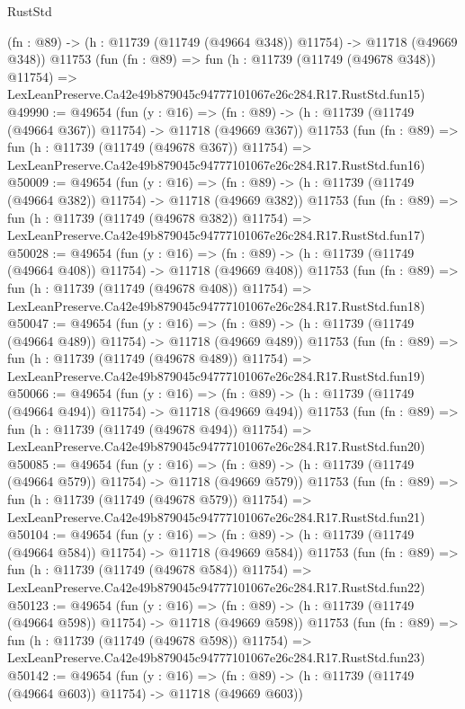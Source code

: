 \begin{lexlean}{RustStd}
\begin{coremodule}
    (fn : @89) -> (h : @11739 (@11749 (@49664 @348)) @11754) -> @11718 (@49669 @348))
    @11753
    (fun (fn : @89) =>
    fun (h : @11739 (@11749 (@49678 @348)) @11754) =>
    LexLeanPreserve.Ca42e49b879045c94777101067e26c284.R17.RustStd.fun15)
@49990 := @49654
    (fun (y : @16) =>
    (fn : @89) -> (h : @11739 (@11749 (@49664 @367)) @11754) -> @11718 (@49669 @367))
    @11753
    (fun (fn : @89) =>
    fun (h : @11739 (@11749 (@49678 @367)) @11754) =>
    LexLeanPreserve.Ca42e49b879045c94777101067e26c284.R17.RustStd.fun16)
@50009 := @49654
    (fun (y : @16) =>
    (fn : @89) -> (h : @11739 (@11749 (@49664 @382)) @11754) -> @11718 (@49669 @382))
    @11753
    (fun (fn : @89) =>
    fun (h : @11739 (@11749 (@49678 @382)) @11754) =>
    LexLeanPreserve.Ca42e49b879045c94777101067e26c284.R17.RustStd.fun17)
@50028 := @49654
    (fun (y : @16) =>
    (fn : @89) -> (h : @11739 (@11749 (@49664 @408)) @11754) -> @11718 (@49669 @408))
    @11753
    (fun (fn : @89) =>
    fun (h : @11739 (@11749 (@49678 @408)) @11754) =>
    LexLeanPreserve.Ca42e49b879045c94777101067e26c284.R17.RustStd.fun18)
@50047 := @49654
    (fun (y : @16) =>
    (fn : @89) -> (h : @11739 (@11749 (@49664 @489)) @11754) -> @11718 (@49669 @489))
    @11753
    (fun (fn : @89) =>
    fun (h : @11739 (@11749 (@49678 @489)) @11754) =>
    LexLeanPreserve.Ca42e49b879045c94777101067e26c284.R17.RustStd.fun19)
@50066 := @49654
    (fun (y : @16) =>
    (fn : @89) -> (h : @11739 (@11749 (@49664 @494)) @11754) -> @11718 (@49669 @494))
    @11753
    (fun (fn : @89) =>
    fun (h : @11739 (@11749 (@49678 @494)) @11754) =>
    LexLeanPreserve.Ca42e49b879045c94777101067e26c284.R17.RustStd.fun20)
@50085 := @49654
    (fun (y : @16) =>
    (fn : @89) -> (h : @11739 (@11749 (@49664 @579)) @11754) -> @11718 (@49669 @579))
    @11753
    (fun (fn : @89) =>
    fun (h : @11739 (@11749 (@49678 @579)) @11754) =>
    LexLeanPreserve.Ca42e49b879045c94777101067e26c284.R17.RustStd.fun21)
@50104 := @49654
    (fun (y : @16) =>
    (fn : @89) -> (h : @11739 (@11749 (@49664 @584)) @11754) -> @11718 (@49669 @584))
    @11753
    (fun (fn : @89) =>
    fun (h : @11739 (@11749 (@49678 @584)) @11754) =>
    LexLeanPreserve.Ca42e49b879045c94777101067e26c284.R17.RustStd.fun22)
@50123 := @49654
    (fun (y : @16) =>
    (fn : @89) -> (h : @11739 (@11749 (@49664 @598)) @11754) -> @11718 (@49669 @598))
    @11753
    (fun (fn : @89) =>
    fun (h : @11739 (@11749 (@49678 @598)) @11754) =>
    LexLeanPreserve.Ca42e49b879045c94777101067e26c284.R17.RustStd.fun23)
@50142 := @49654
    (fun (y : @16) =>
    (fn : @89) -> (h : @11739 (@11749 (@49664 @603)) @11754) -> @11718 (@49669 @603))

\end{coremodule}
\end{lexlean}
